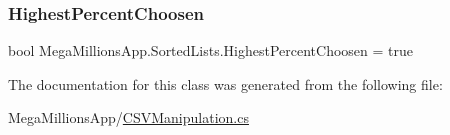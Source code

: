 \subsubsection{\texorpdfstring{Highest\+Percent\+Choosen}{HighestPercentChoosen}}
{\footnotesize\ttfamily bool Mega\+Millions\+App.\+Sorted\+Lists.\+Highest\+Percent\+Choosen = true}



The documentation for this class was generated from the following file\+:\begin{DoxyCompactItemize}
\item 
Mega\+Millions\+App/\hyperlink{_c_s_v_manipulation_8cs}{C\+S\+V\+Manipulation.\+cs}\end{DoxyCompactItemize}
